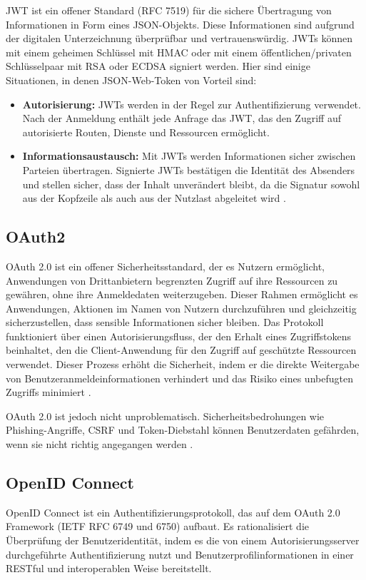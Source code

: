 JWT ist ein offener Standard (RFC 7519) für die sichere Übertragung von Informationen in Form eines JSON-Objekts. Diese Informationen sind aufgrund der digitalen Unterzeichnung überprüfbar und vertrauenswürdig. JWTs können mit einem geheimen Schlüssel mit HMAC oder mit einem öffentlichen/privaten Schlüsselpaar mit RSA oder ECDSA signiert werden. Hier sind einige Situationen, in denen JSON-Web-Token von Vorteil sind:

\begin{itemize}
	\item \textbf{Autorisierung:}  JWTs werden in der Regel zur Authentifizierung verwendet. Nach der Anmeldung enthält jede Anfrage das JWT, das den Zugriff auf autorisierte Routen, Dienste und Ressourcen ermöglicht.
	\item \textbf{Informationsaustausch:} Mit JWTs werden Informationen sicher zwischen Parteien übertragen. Signierte JWTs bestätigen die Identität des Absenders und stellen sicher, dass der Inhalt unverändert bleibt, da die Signatur sowohl aus der Kopfzeile als auch aus der Nutzlast abgeleitet wird \cite{JWT:o.J}.
\end{itemize}

\subsection{OAuth2}
OAuth 2.0 ist ein offener Sicherheitsstandard, der es Nutzern ermöglicht, Anwendungen von Drittanbietern begrenzten Zugriff auf ihre Ressourcen zu gewähren, ohne ihre Anmeldedaten weiterzugeben. Dieser Rahmen ermöglicht es Anwendungen, Aktionen im Namen von Nutzern durchzuführen und gleichzeitig sicherzustellen, dass sensible Informationen sicher bleiben. Das Protokoll funktioniert über einen Autorisierungsfluss, der den Erhalt eines Zugriffstokens beinhaltet, den die Client-Anwendung für den Zugriff auf geschützte Ressourcen verwendet. Dieser Prozess erhöht die Sicherheit, indem er die direkte Weitergabe von Benutzeranmeldeinformationen verhindert und das Risiko eines unbefugten Zugriffs minimiert \cite{OAuth2:2023}.

OAuth 2.0 ist jedoch nicht unproblematisch. Sicherheitsbedrohungen wie Phishing-Angriffe, CSRF und Token-Diebstahl können Benutzerdaten gefährden, wenn sie nicht richtig angegangen werden \cite{OAuth2:2023}.

\subsection{OpenID Connect}
OpenID Connect ist ein Authentifizierungsprotokoll, das auf dem OAuth 2.0 Framework (IETF RFC 6749 und 6750) aufbaut. Es rationalisiert die Überprüfung der Benutzeridentität, indem es die von einem Autorisierungsserver durchgeführte Authentifizierung nutzt und Benutzerprofilinformationen in einer RESTful und interoperablen Weise bereitstellt.

